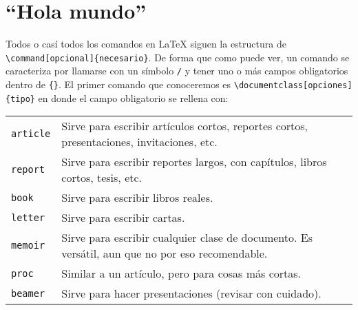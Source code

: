 \documentclass[11pt,oneside,letterpaper]{book}
\theoremstyle{custom}
\theoremstyle{definition}
\begin{document}
\chapter{``Hola mundo''}
Todos o casí todos los comandos en \LaTeX{} siguen la estructura de \lstinline|\command[opcional]{necesario}|. De forma que como puede ver, un comando se caracteriza por llamarse con un símbolo \lstinline|/| y tener uno o más campos obligatorios dentro de \lstinline|{}|. El primer comando que conoceremos es \lstinline|\documentclass[opciones]{tipo}| en donde el campo obligatorio se rellena con:
\begin{longtable}{p{3cm}p{9cm}}
\texttt{article} & Sirve para escribir artículos cortos, reportes cortos, presentaciones, invitaciones, etc.\\
\texttt{report} & Sirve para escribir reportes largos, con capítulos, libros cortos, tesis, etc.\\
\texttt{book} & Sirve para escribir libros reales.\\
\texttt{letter} & Sirve para escribir cartas.\\
\texttt{memoir} & Sirve para escribir cualquier clase de documento. Es versátil, aun que no por eso recomendable.\\
\texttt{proc} & Similar a un artículo, pero para cosas más cortas.\\
\texttt{beamer} & Sirve para hacer presentaciones (revisar con cuidado).
\end{longtable}
\end{document}
